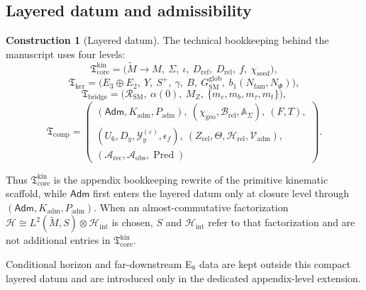 \documentclass[11pt,a4paper]{article}
\theoremstyle{definition}
\newtheorem{construction}[theorem]{Construction}
\theoremstyle{remark}
\newcommand{\Seam}{\Sigma}
\newcommand{\inv}{\iota}
\newcommand{\bone}{b_1}
\newcommand{\SM}{\mathrm{SM}}
\newcommand{\Arec}{\mathcal A_{\mathrm{rec}}}
\newcommand{\Aobs}{\mathcal A_{\mathrm{obs}}}
\newcommand{\Vadm}{\mathcal V_{\mathrm{adm}}}
\newcommand{\Hrel}{\mathcal H_{\mathrm{rel}}}
\newcommand{\Pred}{\operatorname{Pred}}
\newcommand{\Hint}{\mathcal H_{\mathrm{int}}}
\newcommand{\Kadm}{K_{\mathrm{adm}}}
\newcommand{\chiseed}{\chi_{\mathrm{seed}}}
\newcommand{\chigeo}{\chi_{\mathrm{geo}}}
\newcommand{\Tcore}{\mathfrak T_{\mathrm{core}}}
\newcommand{\Tbridge}{\mathfrak T_{\mathrm{bridge}}}
\newcommand{\Tker}{\mathfrak T_{\mathrm{ker}}}
\newcommand{\Tcomp}{\mathfrak T_{\mathrm{comp}}}
\newcommand{\Padm}{P_{\mathrm{adm}}}
\begin{document}
\subsection{Layered datum and admissibility}

\begin{construction}[Layered datum]
The technical bookkeeping behind the manuscript uses four levels:
\[
\Tcore^{\mathrm{kin}}
=
\bigl(
\widetilde M\to M,\ \Seam,\ \inv,\ D_{\mathrm{ref}},\ D_{\mathrm{rel}},\ f,\ \chiseed
\bigr),
\]
\[
\Tker
=
\bigl(
E_3\oplus E_2,\ Y,\ S^+,\ \gamma,\ B,\ G_{\SM}^{\mathrm{glob}},\ \bone(N_{\mathrm{fam}},N_\Phi)
\bigr),
\]
\[
\Tbridge
=
\bigl(
\mathcal R_{\SM},\ \alpha(0),\ M_Z,\ \{m_c,m_b,m_\tau,m_t\}
\bigr),
\]
\[
\Tcomp
=
\left(
\begin{array}{l}
(\mathsf{Adm},\Kadm,\Padm),\ (\chigeo,\mathcal B_{\mathrm{rel}},\mathbb A_{\Seam}),\ (F,T),\\
(U_6,D_y,\mathcal Y_y^{(\varepsilon)},\epsilon_f),\ (Z_{\mathrm{rel}},\Theta,\Hrel,\Vadm),\\
(\Arec,\Aobs,\Pred)
\end{array}
\right).
\]
\end{construction}

Thus $\Tcore^{\mathrm{kin}}$ is the appendix bookkeeping rewrite of the primitive kinematic
scaffold, while $\mathsf{Adm}$ first enters the layered datum only at closure level through
$(\mathsf{Adm},\Kadm,\Padm)$. When an almost-commutative factorization
$\mathcal H\cong L^2(\widetilde M,S)\otimes\Hint$ is chosen, $S$ and $\Hint$ refer to that
factorization and are not additional entries in $\Tcore^{\mathrm{kin}}$.

Conditional horizon and far-downstream E$_8$ data are kept outside this compact layered datum and are introduced only in the dedicated appendix-level extension.
\end{document}
